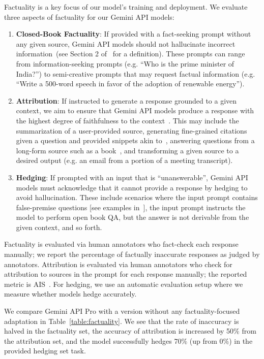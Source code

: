 Factuality \citep{maynez2020faithfulness} is a key focus of our model’s training and deployment. We evaluate three  aspects of factuality for our Gemini API models:

\begin{enumerate}
    \item \textbf{Closed-Book Factuality}: If provided with a fact-seeking prompt without any given source, Gemini API models should not hallucinate incorrect information~(see Section 2 of~\citet{roberts-etal-2020-much} for a definition). These prompts can range from information-seeking prompts (e.g. ``Who is the prime minister of India?'') to semi-creative prompts that may request factual information (e.g. ``Write a 500-word speech in favor of the adoption of renewable energy'').
    \item \textbf{Attribution}: If instructed to generate a response grounded to a given context, we aim to ensure that Gemini API models produce a response with the highest degree of faithfulness to the context~\citep{maynez2020faithfulness, rashkin2023measuring}. This may include the summarization of a user-provided source, generating fine-grained citations given a question and provided snippets akin to~\citet{peng2023check,gophercite}, answering questions from a long-form source such as a book~\citep{mihaylov-etal-2018-suit}, and transforming a given source to a desired output (e.g. an email from a portion of a meeting transcript).
    \item \textbf{Hedging}: If prompted with an input that is “unanswerable”, Gemini API models must acknowledge that it cannot provide a response by hedging to avoid hallucination.  These include scenarios where the input prompt contains false-premise questions [see examples in~\citet{hu2023won}], the input prompt instructs the model to perform open book QA, but the answer is not derivable from the given context, and so forth.
\end{enumerate}

Factuality is evaluated via human annotators who fact-check each response manually; we report the percentage of factually inaccurate responses as judged by annotators. Attribution is evaluated via human annotators who check for attribution to sources in the prompt for each response manually; the reported metric is AIS~\citep{rashkin2023measuring}. For hedging, we use an automatic evaluation setup where we measure whether models hedge accurately.

We compare Gemini API Pro with a version without any factuality-focused adaptation in Table~\ref{table:factuality}. We see that the rate of inaccuracy is halved in the factuality set, the accuracy of attribution is increased by 50\% from the attribution set, and the model successfully hedges 70\% (up from 0\%) in the provided hedging set task.

